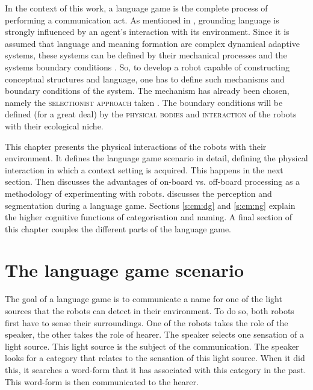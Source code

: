 

In the context of this work, a language game is the complete process of performing a communication act. As mentioned in , grounding language is strongly influenced by an agent's interaction with its environment. Since it is assumed that language and meaning formation are complex dynamical adaptive systems, these systems can be defined by their mechanical processes and the systems boundary conditions \citep{prigogine}. So, to develop a robot capable of constructing conceptual structures and language, one has to define such mechanisms and boundary conditions of the system. The mechanism has already been chosen, namely the {\scshape selectionist approach} taken \citep{steels:1996a,steels:1996b}. The boundary conditions will be defined (for a great deal) by the {\scshape physical bodies} and {\scshape interaction} of the robots with their ecological niche. 


This chapter presents the physical interactions of the robots with their environment. It defines the language game scenario in detail, defining the physical interaction in which a context setting is acquired. This happens in the next section. Then  discusses the advantages of on-board vs. off-board processing as a methodology of experimenting with robots.   discusses the perception and segmentation during a language game. Sections \ref{s:cm:dg} and \ref{s:cm:ng} explain the higher cognitive functions of categorisation and naming. A final section of this chapter couples the different parts of the language game.


\section{The language game scenario}\label{s:lg:scenario}



The goal of a language game is to communicate a name for one of the light sources that the robots can detect in their environment. To do so, both robots first have to sense their surroundings. One of the robots takes the role of the speaker, the other takes the role of hearer. The speaker selects one sensation of a light source. This light source is the subject of the communication. The speaker looks for a category that relates to the sensation of this light source. When it did this, it searches a word-form that it has associated with this category in the past. This word-form is then communicated to the hearer. 

